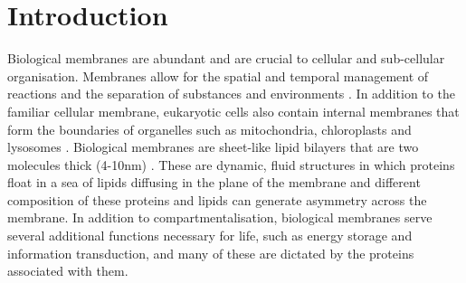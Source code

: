 
\section{Introduction}

Biological membranes are abundant and are crucial to cellular and sub-cellular organisation. Membranes allow for the spatial and temporal management of reactions and the separation of substances and environments \cite{simunovic_when_2015}. In addition to the familiar cellular membrane, eukaryotic cells also contain internal membranes that form the boundaries of organelles such as mitochondria, chloroplasts and lysosomes \cite{zimmerberg_how_2006}. Biological membranes are sheet-like lipid bilayers that are two molecules thick (4-10nm) \cite{berg_biochemistry_2002}. These are dynamic, fluid structures in which proteins float in a sea of lipids diffusing in the plane of the membrane and different composition of these proteins and lipids can generate asymmetry across the membrane. In addition to compartmentalisation, biological membranes serve several additional functions necessary for life, such as energy storage and information transduction, and many of these are dictated by the proteins associated with them.

